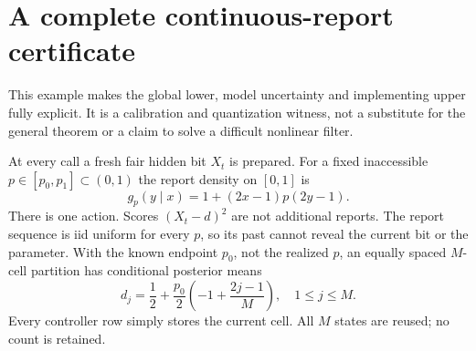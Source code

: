 \section{A complete continuous-report certificate}\label{sec:certificate}
This example makes the global lower, model uncertainty and implementing upper fully explicit. It is a calibration and quantization witness, not a substitute for the general theorem or a claim to solve a difficult nonlinear filter.

At every call a fresh fair hidden bit $X_t$ is prepared. For a fixed inaccessible $p\in[p_0,p_1]\subset(0,1)$ the report density on $[0,1]$ is
\begin{equation}\label{eq:signal}
 g_p(y\mid x)=1+(2x-1)p(2y-1).
\end{equation}
There is one action. Scores $(X_t-d)^2$ are not additional reports. The report sequence is iid uniform for every $p$, so its past cannot reveal the current bit or the parameter. With the known endpoint $p_0$, not the realized $p$, an equally spaced $M$-cell partition has conditional posterior means
\[
 d_j=\frac12+\frac{p_0}{2}\left(-1+\frac{2j-1}{M}\right),\quad 1\le j\le M.
\]
Every controller row simply stores the current cell. All $M$ states are reused; no count is retained.

